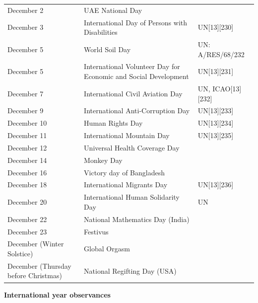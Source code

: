 \documentclass[
  openany]{book}
\begin{document}
\begin{longtable}[t]{>{\raggedright\arraybackslash}p{8em}>{\raggedright\arraybackslash}p{20em}>{\raggedright\arraybackslash}p{12em}}
\addlinespace
December 2 & UAE National Day & \\
\rowcolor{gray!6}  December 3 & International Day of Persons with Disabilities & UN[13][230]\\
December 5 & World Soil Day & UN: A/RES/68/232\\
\rowcolor{gray!6}  December 5 & International Volunteer Day for Economic and Social Development & UN[13][231]\\
December 7 & International Civil Aviation Day & UN, ICAO[13][232]\\
\addlinespace
\rowcolor{gray!6}  December 9 & International Anti-Corruption Day & UN[13][233]\\
December 10 & Human Rights Day & UN[13][234]\\
\rowcolor{gray!6}  December 11 & International Mountain Day & UN[13][235]\\
December 12 & Universal Health Coverage Day & \\
\rowcolor{gray!6}  December 14 & Monkey Day & \\
\addlinespace
December 16 & Victory day of Bangladesh & \\
\rowcolor{gray!6}  December 18 & International Migrants Day & UN[13][236]\\
December 20 & International Human Solidarity Day & UN\\
\rowcolor{gray!6}  December 22 & National Mathematics Day (India) & \\
December 23 & Festivus & \\
\addlinespace
\rowcolor{gray!6}  December (Winter Solstice) & Global Orgasm & \\
December (Thursday before Christmas) & National Regifting Day (USA) & \\
\bottomrule
\end{longtable}

\textbf{International year observances}
\end{document}
